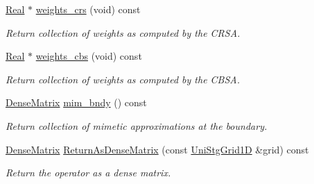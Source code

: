 \begin{DoxyCompactItemize}
\hyperlink{group__c01-roots_gac080bbbf5cbb5502c9f00405f894857d}{Real} $\ast$ \hyperlink{classmtk_1_1Div1D_ab5c791285e7e51a85b8c62a1b0ab9126}{weights\+\_\+crs} (void) const 
\begin{DoxyCompactList}\small\item\em Return collection of weights as computed by the C\+R\+S\+A. \end{DoxyCompactList}\item 
\hyperlink{group__c01-roots_gac080bbbf5cbb5502c9f00405f894857d}{Real} $\ast$ \hyperlink{classmtk_1_1Div1D_a5d4fe8c61ce41cb1134a3f9cb16deb59}{weights\+\_\+cbs} (void) const 
\begin{DoxyCompactList}\small\item\em Return collection of weights as computed by the C\+B\+S\+A. \end{DoxyCompactList}\item 
\hyperlink{classmtk_1_1DenseMatrix}{Dense\+Matrix} \hyperlink{classmtk_1_1Div1D_a2c844ef39825e73e4024d35fcdd42b12}{mim\+\_\+bndy} () const 
\begin{DoxyCompactList}\small\item\em Return collection of mimetic approximations at the boundary. \end{DoxyCompactList}\item 
\hyperlink{classmtk_1_1DenseMatrix}{Dense\+Matrix} \hyperlink{classmtk_1_1Div1D_a213fddbaaf86e4840c6a9649b69c2d49}{Return\+As\+Dense\+Matrix} (const \hyperlink{classmtk_1_1UniStgGrid1D}{Uni\+Stg\+Grid1\+D} \&grid) const 
\begin{DoxyCompactList}\small\item\em Return the operator as a dense matrix. \end{DoxyCompactList}\end{DoxyCompactItemize}

